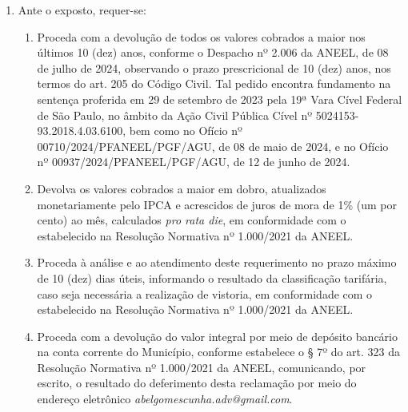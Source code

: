 \begin{enumerate}[resume]
    
\item Ante o exposto, requer-se:

\begin{enumerate}

    \item Proceda com a devolução de todos os valores cobrados a maior nos últimos 10 (dez) anos, conforme o Despacho nº 2.006 da ANEEL, de 08 de julho de 2024, observando o prazo prescricional de 10 (dez) anos, nos termos do art. 205 do Código Civil. Tal pedido encontra fundamento na sentença proferida em 29 de setembro de 2023 pela 19ª Vara Cível Federal de São Paulo, no âmbito da Ação Civil Pública Cível nº 5024153-93.2018.4.03.6100, bem como no Ofício nº 00710/2024/PFANEEL/PGF/AGU, de 08 de maio de 2024, e no Ofício nº 00937/2024/PFANEEL/PGF/AGU, de 12 de junho de 2024.

    \item Devolva os valores cobrados a maior em dobro, atualizados monetariamente pelo IPCA e acrescidos de juros de mora de 1\% (um por cento) ao mês, calculados \textit{pro rata die}, em conformidade com o estabelecido na Resolução Normativa nº 1.000/2021 da ANEEL.

    \item Proceda à análise e ao atendimento deste requerimento no prazo máximo de 10 (dez) dias úteis, informando o resultado da classificação tarifária, caso seja necessária a realização de vistoria, em conformidade com o estabelecido na Resolução Normativa nº 1.000/2021 da ANEEL.

    \item Proceda com a devolução do valor integral por meio de depósito bancário na conta corrente do Município, conforme estabelece o § 7º do art. 323 da Resolução Normativa nº 1.000/2021 da ANEEL, comunicando, por escrito, o resultado do deferimento desta reclamação por meio do endereço eletrônico \textit{abelgomescunha.adv@gmail.com}.
\end{enumerate}

\end{enumerate}